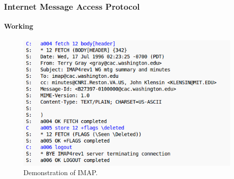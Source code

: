 \documentclass{beamer}
\begin{document}
\begin{frame}
  \frametitle{Internet Message Access Protocol}
  \framesubtitle{Working}
  \begin{figure}[h]
    \includegraphics[scale = 0.35]{imap2.png}
    \caption{Demonstration of IMAP.}
    \centering
  \end{figure}
\end{frame}
\end{document}
